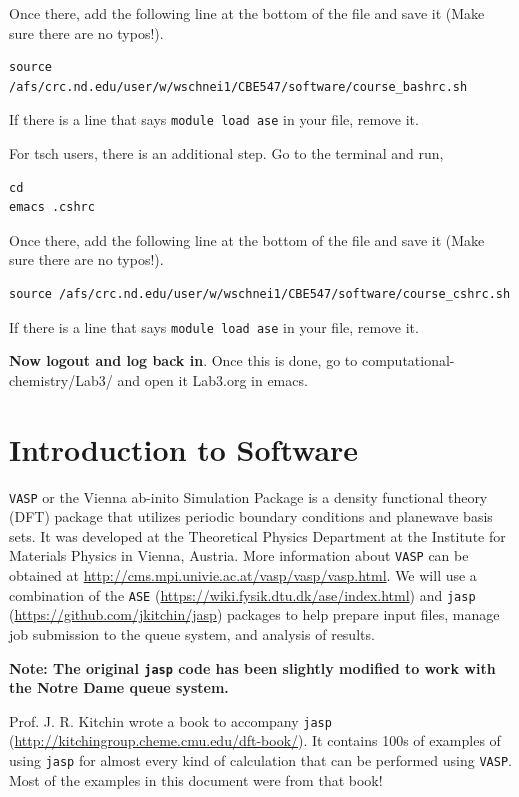 \documentclass[11pt]{article}
\begin{document}
Once there, add the following line at the bottom of the file and save it (Make sure there are no typos!).

\begin{verbatim}
source /afs/crc.nd.edu/user/w/wschnei1/CBE547/software/course_bashrc.sh
\end{verbatim}

If there is a line that says \verb~module load ase~ in your file, remove it.

For tsch users, there is an additional step. Go to the terminal and run,

\begin{verbatim}
cd
emacs .cshrc
\end{verbatim}

Once there, add the following line at the bottom of the file and save it (Make sure there are no typos!). 

\begin{verbatim}
source /afs/crc.nd.edu/user/w/wschnei1/CBE547/software/course_cshrc.sh
\end{verbatim}

If there is a line that says \verb~module load ase~ in your file, remove it.

\textbf{Now logout and log back in}. Once this is done, go to computational-chemistry/Lab3/ and open it Lab3.org in emacs.


\section{Introduction to Software}
\label{sec-3}

\texttt{VASP} or the Vienna ab-inito Simulation Package is a density functional theory (DFT) package that utilizes periodic boundary conditions and planewave basis sets. It was developed at the Theoretical Physics Department at the Institute for Materials Physics in Vienna, Austria. More information about \texttt{VASP} can be obtained at \url{http://cms.mpi.univie.ac.at/vasp/vasp/vasp.html}. We will use a combination of the \texttt{ASE} (\url{https://wiki.fysik.dtu.dk/ase/index.html}) and \texttt{jasp} (\url{https://github.com/jkitchin/jasp}) packages to help prepare input files, manage job submission to the queue system, and analysis of results.  

\textbf{Note: The original \texttt{jasp} code has been slightly modified to work with the Notre Dame queue system.}

Prof. J. R. Kitchin wrote a book to accompany \texttt{jasp} (\url{http://kitchingroup.cheme.cmu.edu/dft-book/}). It contains 100s of examples of using \texttt{jasp} for almost every kind of calculation that can be performed using \texttt{VASP}. Most of the examples in this document were from that book!
\end{document}
